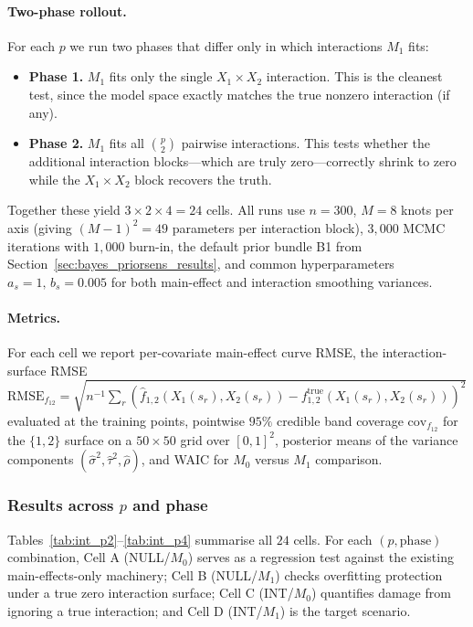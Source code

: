 \paragraph{Two-phase rollout.}
For each $p$ we run two phases that differ only in which interactions $M_1$ fits:
\begin{itemize}
\item \textbf{Phase 1.} $M_1$ fits only the single $X_1\times X_2$ interaction. This is the
cleanest test, since the model space exactly matches the true nonzero interaction (if any).
\item \textbf{Phase 2.} $M_1$ fits all $\binom{p}{2}$ pairwise interactions. This tests
whether the additional interaction blocks---which are truly zero---correctly shrink to
zero while the $X_1\times X_2$ block recovers the truth.
\end{itemize}
Together these yield $3\times 2\times 4=24$ cells. All runs use $n=300$, $M=8$ knots per
axis (giving $(M-1)^2=49$ parameters per interaction block), $3{,}000$ MCMC iterations with
$1{,}000$ burn-in, the default prior bundle B1 from
Section~\ref{sec:bayes_priorsens_results}, and common hyperparameters
$a_s=1,\,b_s=0.005$ for both main-effect and interaction smoothing variances.

\paragraph{Metrics.}
For each cell we report per-covariate main-effect curve RMSE, the interaction-surface RMSE
\(\mathrm{RMSE}_{f_{12}}=\sqrt{n^{-1}\sum_r(\hat f_{1,2}(X_1(s_r),X_2(s_r))-f^{\mathrm{true}}_{1,2}(X_1(s_r),X_2(s_r)))^2}\)
evaluated at the training points, pointwise $95\%$ credible band coverage
$\mathrm{cov}_{f_{12}}$ for the $\{1,2\}$ surface on a $50\times 50$ grid over $[0,1]^2$,
posterior means of the variance components $(\hat\sigma^2,\hat\tau^2,\hat\rho)$, and WAIC
for $M_0$ versus $M_1$ comparison.

\subsubsection{Results across $p$ and phase}\label{sec:int_results}

Tables~\ref{tab:int_p2}--\ref{tab:int_p4} summarise all $24$ cells. For each $(p,\text{phase})$
combination, Cell A (NULL/$M_0$) serves as a regression test against the existing
main-effects-only machinery; Cell B (NULL/$M_1$) checks overfitting protection under a true
zero interaction surface; Cell C (INT/$M_0$) quantifies damage from ignoring a true
interaction; and Cell D (INT/$M_1$) is the target scenario.

